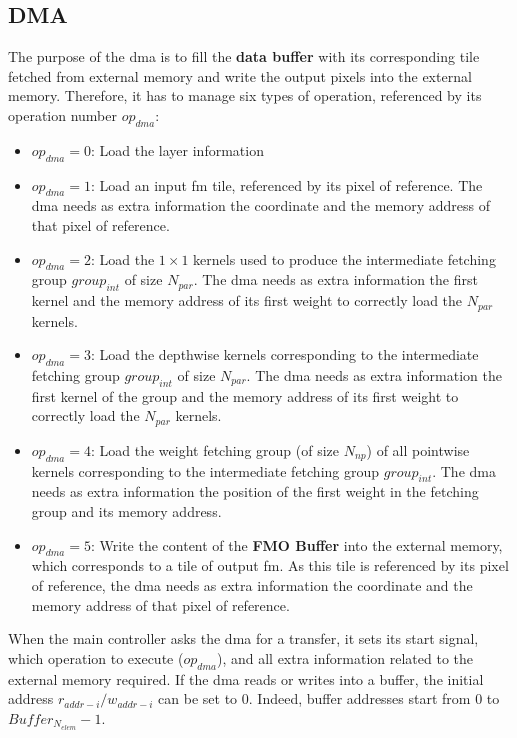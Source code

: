 \subsection{DMA}
%
The purpose of the \acrshort{dma} is to fill the \textbf{data buffer} with its corresponding tile fetched from external memory and write the output pixels into the external memory. Therefore, it has to manage six types of operation, referenced by its operation number $op_{dma}$:
%
\begin{itemize}
    \item $op_{dma} = 0$: Load the layer information
    \item $op_{dma} = 1$: Load an input \acrshort{fm} tile, referenced by its pixel of reference. The \acrshort{dma} needs as extra information the coordinate and the memory address of that pixel of reference.
    \item $op_{dma} = 2$: Load the $1 \times 1$ kernels used to produce the intermediate fetching group $group_{int}$ of size $N_{par}$. The \acrshort{dma} needs as extra information the first kernel and the memory address of its first weight to correctly load the $N_{par}$ kernels.
    \item $op_{dma} = 3$: Load the depthwise kernels corresponding to the intermediate fetching group $group_{int}$ of size $N_{par}$. The \acrshort{dma} needs as extra information the first kernel of the group and the memory address of its first weight to correctly load the $N_{par}$ kernels.
    \item $op_{dma} = 4$: Load the weight fetching group (of size $N_{np}$) of all pointwise kernels corresponding to the intermediate fetching group $group_{int}$. The \acrshort{dma} needs as extra information the position of the first weight in the fetching group and its memory address.
    \item $op_{dma} = 5$: Write the content of the \textbf{FMO Buffer} into the external memory, which corresponds to a tile of output \acrshort{fm}. As this tile is referenced by its pixel of reference, the \acrshort{dma} needs as extra information the coordinate and the memory address of that pixel of reference.
\end{itemize}

When the main controller asks the \acrshort{dma} for a transfer, it sets its start signal, which operation to execute ($op_{dma}$), and all extra information related to the external memory required. If the \acrshort{dma} reads or writes into a buffer, the initial address $r_{addr-i}/w_{addr-i}$ can be set to 0. Indeed, buffer addresses start from 0 to $Buffer_{N_{elem}} - 1$. 

